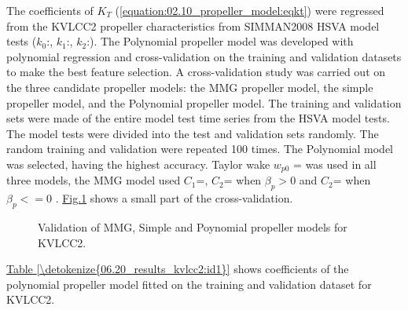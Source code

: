 \documentclass[review]{elsarticle}
\begin{document}
The coefficients of \(K_T\) (\autoref{equation:02.10_propeller_model:eqkt}) were regressed from the KVLCC2 propeller characteristics from SIMMAN2008 HSVA model tests \cite{stern_experience_2011} (\(k_0\):, \(k_1\):, \(k_2\):).
The Polynomial propeller model was developed with polynomial regression and cross-validation on the training and validation datasets to make the best feature selection.
A cross-validation study was carried out on the three candidate propeller models: the MMG propeller model, the simple propeller model, and the Polynomial propeller model. The training and validation sets were made of the entire model test time series from the HSVA model tests.
The model tests were divided into the test and validation sets randomly. The random training and validation were repeated 100 times. The Polynomial model was selected, having the highest accuracy. Taylor wake \(w_{p0}\) =  was used in all three models, the MMG model used \(C_1\)=, \(C_2\)= when \(\beta_p>0\) and \(C_2\)= when \(\beta_p<=0\) \cite{yasukawa_introduction_2015-1}. \hyperref[\detokenize{06.20_results_kvlcc2:fig-propeller-validation}]{Fig.\@ \ref{\detokenize{06.20_results_kvlcc2:fig-propeller-validation}}} shows a small part of the cross-validation.

 \begin{figure}[H]
 \centering
 \capstart

 \noindent{}
 \caption{Validation of MMG, Simple and Poynomial propeller models for KVLCC2.}\label{\detokenize{06.20_results_kvlcc2:fig-propeller-validation}}\end{figure}

  
\hyperref[\detokenize{06.20_results_kvlcc2:id1}]{Table \ref{\detokenize{06.20_results_kvlcc2:id1}}} shows coefficients of the polynomial propeller model fitted on the training and validation dataset for KVLCC2.
\end{document}
